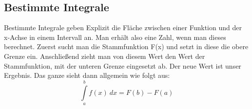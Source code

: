 \subsection{Bestimmte Integrale}
Bestimmte Integrale geben Explizit die Fläche zwischen einer Funktion und der x-Achse in einem Intervall an. Man erhält also eine Zahl, wenn man dieses berechnet. Zuerst sucht man die Stammfunktion F(x) und setzt in diese die obere Grenze ein. Anschließend zieht man von diesem Wert den Wert der Stammfunktion, mit der unteren Grenze eingesetzt ab. Der neue Wert ist unser Ergebnis. Das ganze sieht dann allgemein wie folgt aus:
\[\int\limits_a^b f(x) \ dx=F(b)-F(a)\]
